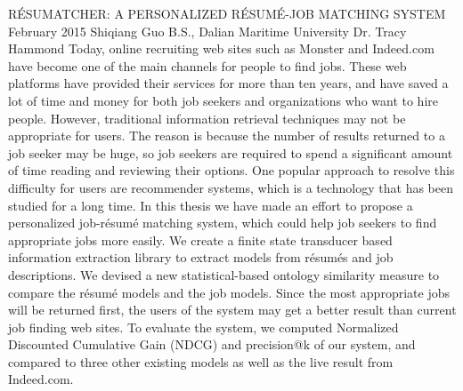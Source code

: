 \begingroup
\absone
{R\'ESUMATCHER: A PERSONALIZED R\'ESUM\'E-JOB MATCHING SYSTEM}
{February 2015}
{Shiqiang Guo}
{B.S., Dalian Maritime University}  %
{Dr. Tracy Hammond}%
{ Today, online recruiting web sites such as Monster and Indeed.com have become one of the main channels for people to find jobs. These web platforms have provided their services for more than ten years, and have saved a lot of time and money for both job seekers and organizations who want to hire people. However, traditional information retrieval techniques may not be appropriate for users. The reason is because the number of results returned to a job seeker may be huge, so job seekers are required to spend a significant amount of time reading and reviewing their options. One popular approach to resolve this difficulty for users are recommender systems, which is a technology that has been studied for a long time.
In this thesis we have made an effort to propose a personalized job-r\'esum\'e matching system, which could help job seekers to find appropriate jobs more easily. We create a finite state transducer based information extraction library to extract models from r\'esum\'es and job descriptions. We devised a new statistical-based ontology similarity measure to compare the r\'esum\'e models and the job models. Since the most appropriate jobs will be returned first, the users of the system may get a better result than current job finding web sites. To evaluate the system, we computed Normalized Discounted Cumulative Gain (NDCG) and precision@k of our system, and compared to three other existing models as well as the live result from Indeed.com.
}
\endgroup



